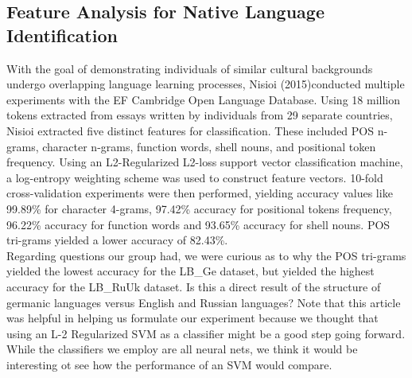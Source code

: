 \documentclass[11pt,a4paper]{article}
\newcommand\tab[1][1cm]{\hspace*{#1}}
\begin{document}
 \subsection{Feature Analysis for Native Language Identification}
 \tab With the goal of demonstrating individuals of similar cultural backgrounds undergo overlapping language learning processes, Nisioi (2015)conducted multiple experiments with the EF Cambridge Open Language Database. Using 18 million tokens extracted from essays written by individuals from 29 separate countries, Nisioi extracted five distinct features for classification. These included POS n-grams, character n-grams, function words, shell nouns, and positional token frequency. Using an L2-Regularized L2-loss support vector classification machine, a log-entropy weighting scheme was used to construct feature vectors. 10-fold cross-validation experiments were then performed, yielding accuracy values like 99.89\% for character 4-grams, 97.42\% accuracy for positional tokens frequency, 96.22\% accuracy for function words and 93.65\% accuracy for shell nouns. POS tri-grams yielded a lower accuracy of 82.43\%. \\
 \tab Regarding questions our group had, we were curious as to why the POS tri-grams yielded the lowest accuracy for the LB\_Ge dataset, but yielded the highest accuracy for the LB\_RuUk dataset. Is this a direct result of the structure of germanic languages versus English and Russian languages? Note that this article was helpful in helping us formulate our experiment because we thought that using an L-2 Regularized SVM as a classifier might be a good step going forward. While the classifiers we employ are all neural nets, we think it would be interesting ot see how the performance of an SVM would compare. 
 
\end{document}
